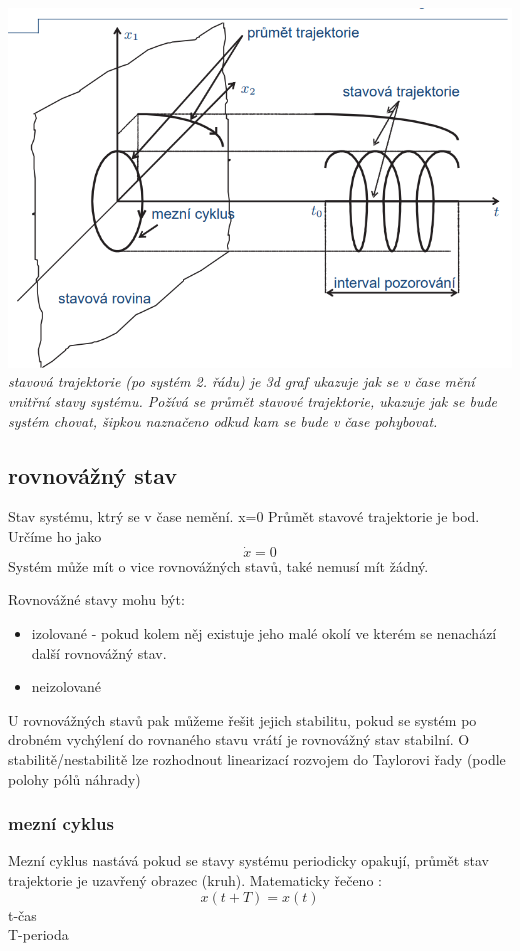 \includegraphics[scale = 0.8]{img/trajektorie.png}
{
\it stavová trajektorie (po systém 2. řádu) je 3d graf ukazuje jak se v čase mění vnitřní stavy systému.
Požívá se průmět stavové trajektorie, ukazuje jak se bude systém chovat, šipkou naznačeno odkud kam se bude v čase pohybovat.
}
\subsection{rovnovážný stav}
Stav systému, ktrý se v čase nemění. x=0 Průmět stavové trajektorie je bod. Určíme
ho jako \[ \dot{x} = 0 \]
Systém může mít o vice rovnovážných stavů, také nemusí mít žádný.

Rovnovážné stavy mohu být:
\begin{itemize}
    \item izolované - pokud kolem něj existuje jeho malé okolí ve kterém se nenachází další rovnovážný stav.
    \item neizolované
\end{itemize}

U rovnovážných stavů pak můžeme řešit jejich stabilitu, pokud se systém po drobném vychýlení do rovnaného 
stavu vrátí je rovnovážný stav stabilní.
O stabilitě/nestabilitě lze rozhodnout linearizací rozvojem do Taylorovi řady (podle polohy pólů náhrady)

\subsubsection{mezní cyklus}
Mezní cyklus nastává pokud se stavy systému periodicky opakují, průmět stav trajektorie je uzavřený obrazec (kruh).
Matematicky řečeno :
\[x(t+T)=x(t)\]
t-čas \\ T-perioda\\

